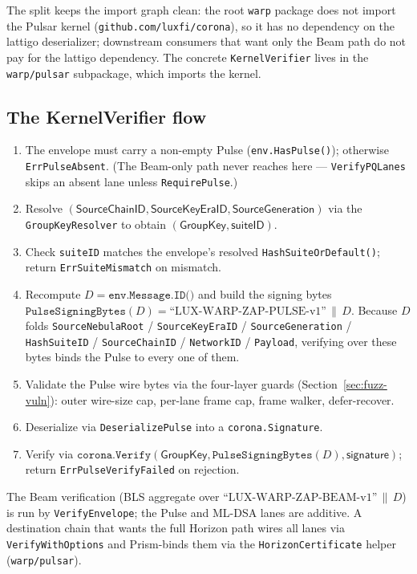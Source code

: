 The split keeps the import graph clean: the root \texttt{warp} package does not import the Pulsar kernel (\texttt{github.com/luxfi/corona}), so it has no dependency on the lattigo deserializer; downstream consumers that want only the Beam path do not pay for the lattigo dependency. The concrete \texttt{KernelVerifier} lives in the \texttt{warp/pulsar} subpackage, which imports the kernel.

\subsection{The KernelVerifier flow}

\begin{enumerate}[leftmargin=2em,nosep]
  \item The envelope must carry a non-empty Pulse (\texttt{env.HasPulse()}); otherwise \texttt{ErrPulseAbsent}. (The Beam-only path never reaches here --- \texttt{VerifyPQLanes} skips an absent lane unless \texttt{RequirePulse}.)
  \item Resolve $(\mathsf{SourceChainID}, \mathsf{SourceKeyEraID}, \mathsf{SourceGeneration})$ via the \texttt{GroupKeyResolver} to obtain $(\mathsf{GroupKey}, \mathsf{suiteID})$.
  \item Check \texttt{suiteID} matches the envelope's resolved \texttt{HashSuiteOrDefault()}; return \texttt{ErrSuiteMismatch} on mismatch.
  \item Recompute $D = \texttt{env.Message.ID()}$ and build the signing bytes $\texttt{PulseSigningBytes}(D) = \text{``LUX-WARP-ZAP-PULSE-v1''} \,\|\, D$. Because $D$ folds \texttt{SourceNebulaRoot} / \texttt{SourceKeyEraID} / \texttt{SourceGeneration} / \texttt{HashSuiteID} / \texttt{SourceChainID} / \texttt{NetworkID} / \texttt{Payload}, verifying over these bytes binds the Pulse to every one of them.
  \item Validate the Pulse wire bytes via the four-layer guards (Section~\ref{sec:fuzz-vuln}): outer wire-size cap, per-lane frame cap, frame walker, defer-recover.
  \item Deserialize via \texttt{DeserializePulse} into a \texttt{corona.Signature}.
  \item Verify via $\texttt{corona.Verify}(\mathsf{GroupKey}, \texttt{PulseSigningBytes}(D), \mathsf{signature})$; return \texttt{ErrPulseVerifyFailed} on rejection.
\end{enumerate}

The Beam verification (BLS aggregate over $\text{``LUX-WARP-ZAP-BEAM-v1''}\,\|\,D$) is run by \texttt{VerifyEnvelope}; the Pulse and ML-DSA lanes are additive. A destination chain that wants the full Horizon path wires all lanes via \texttt{VerifyWithOptions} and Prism-binds them via the \texttt{HorizonCertificate} helper (\texttt{warp/pulsar}).

